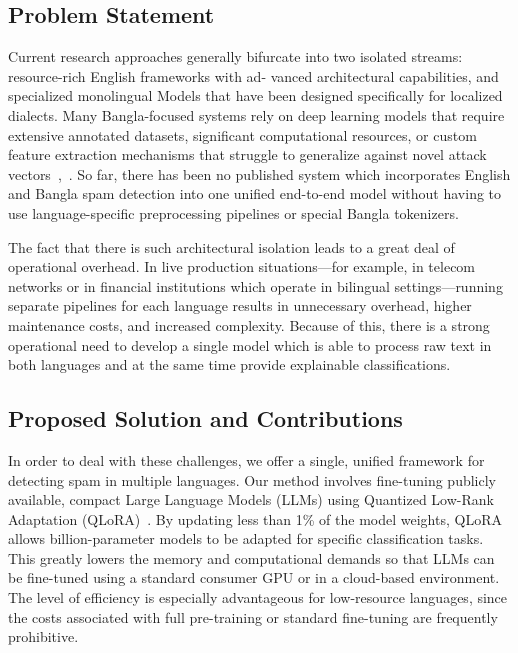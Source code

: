 \documentclass[journal]{IEEEtran}
\begin{document}
\subsection{Problem Statement}

Current research approaches generally bifurcate into two
isolated streams: resource-rich English frameworks with ad-
vanced architectural capabilities, and specialized monolingual
Models that have been designed specifically for localized dialects. Many
Bangla-focused systems rely on deep learning models that
require extensive annotated datasets, significant computational
resources, or custom feature extraction mechanisms that struggle to generalize against novel attack vectors~\cite{ref7},~\cite{ref10}. So far, there has been no published system which incorporates English and Bangla spam detection into one unified end-to-end model without having to use language-specific preprocessing pipelines or special Bangla tokenizers.

The fact that there is such architectural isolation leads to a great deal of operational overhead. In live production situations—for example, in telecom networks or in financial institutions which operate in bilingual settings—running separate pipelines for each language results in unnecessary overhead, higher maintenance costs, and increased complexity. Because of this, there is a strong operational need to develop a single model which is able to process raw text in both languages and at the same time provide explainable classifications.

\subsection{Proposed Solution and Contributions}

In order to deal with these challenges, we offer a single, unified framework for detecting spam in multiple languages. Our method involves fine-tuning publicly available, compact Large Language Models (LLMs) using Quantized Low-Rank Adaptation (QLoRA)~\cite{ref11}. By updating less than 1\% of the model weights, QLoRA allows billion-parameter models to be adapted for specific classification tasks. This greatly lowers the memory and computational demands so that LLMs can be fine-tuned using a standard consumer GPU or in a cloud-based environment. The level of efficiency is especially advantageous for low-resource languages, since the costs associated with full pre-training or standard fine-tuning are frequently prohibitive.
\end{document}
